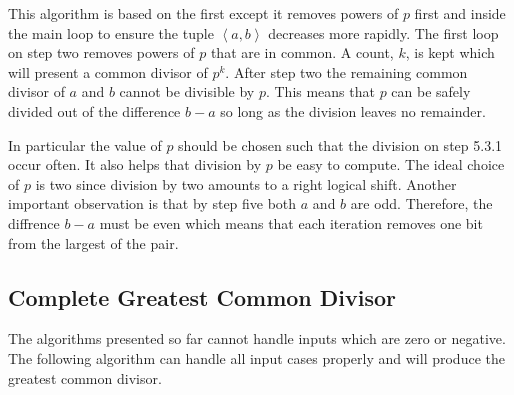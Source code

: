 \documentclass[b5paper]{book}
\begin{document}
This algorithm is based on the first except it removes powers of $p$ first and inside the main loop to ensure the tuple $\left < a, b \right >$ 
decreases more rapidly.  The first loop on step two removes powers of $p$ that are in common.  A count, $k$, is kept which will present a common
divisor of $p^k$.  After step two the remaining common divisor of $a$ and $b$ cannot be divisible by $p$.  This means that $p$ can be safely 
divided out of the difference $b - a$ so long as the division leaves no remainder.  

In particular the value of $p$ should be chosen such that the division on step 5.3.1 occur often.  It also helps that division by $p$ be easy
to compute.  The ideal choice of $p$ is two since division by two amounts to a right logical shift.  Another important observation is that by
step five both $a$ and $b$ are odd.  Therefore, the diffrence $b - a$ must be even which means that each iteration removes one bit from the 
largest of the pair.

\subsection{Complete Greatest Common Divisor}
The algorithms presented so far cannot handle inputs which are zero or negative.  The following algorithm can handle all input cases properly
and will produce the greatest common divisor.
\end{document}
